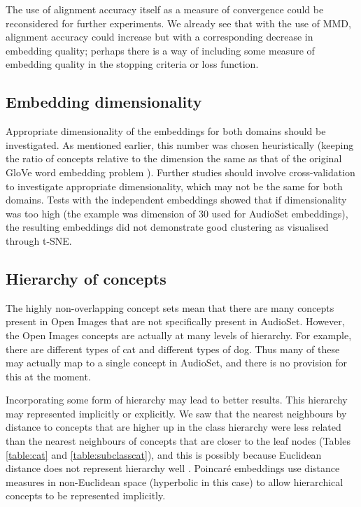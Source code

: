 The use of alignment accuracy itself as a measure of convergence could be reconsidered for further experiments. We already see that with the use of MMD, alignment accuracy could increase but with a corresponding decrease in embedding quality; perhaps there is a way of including some measure of embedding quality in the stopping criteria or loss function.  

\subsection{Embedding dimensionality}
Appropriate dimensionality of the embeddings for both domains should be investigated. As mentioned earlier, this number was chosen heuristically (keeping the ratio of concepts relative to the dimension the same as that of the original GloVe word embedding problem \cite{pennington2014glove}). Further studies should involve cross-validation to investigate appropriate dimensionality, which may not be the same for both domains. Tests with the independent embeddings showed that if dimensionality was too high (the example was dimension of 30 used for AudioSet embeddings), the resulting embeddings did not demonstrate good clustering as visualised through t-SNE. 

\subsection{Hierarchy of concepts}
The highly non-overlapping concept sets mean that there are many concepts present in Open Images that are not specifically present in AudioSet. However, the Open Images concepts are actually at many levels of hierarchy. For example, there are different types of cat and different types of dog. Thus many of these may actually map to a single concept in AudioSet, and there is no provision for this at the moment. 

Incorporating some form of hierarchy may lead to better results. This hierarchy may represented implicitly or explicitly.   We saw that the nearest neighbours by distance to concepts that are higher up in the class hierarchy were less related than the nearest neighbours of concepts that are closer to the leaf nodes (Tables \ref{table:cat} and \ref{table:subclasscat}), and this is possibly because Euclidean distance does not represent hierarchy well \cite{NNAnalysisPsychologicalSpaces}. Poincar{\'{e}} embeddings \cite{PoincareEmbeddings} use distance measures in non-Euclidean space (hyperbolic in this case) to allow hierarchical concepts to be represented implicitly.

